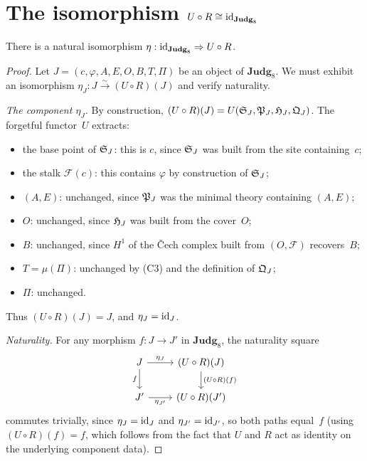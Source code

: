 \section{The isomorphism $U \circ R \cong \mathrm{id}_{\mathbf{Judg}_8}$}
\label{sec:UR}

\begin{theorem}
\label{thm:UR}
There is a natural isomorphism $\eta : \mathrm{id}_{\mathbf{Judg}_8}
\Rightarrow U \circ R$.
\end{theorem}

\begin{proof}
Let $J = (c, \varphi, A, E, O, B, T, \Pi)$ be an object of
$\mathbf{Judg}_8$.  We must exhibit an isomorphism
$\eta_J : J \xrightarrow{\sim} (U \circ R)(J)$ and verify
naturality.

\emph{The component $\eta_J$.}  By construction,
$(U \circ R)(J) = U(\mathfrak{S}_J, \mathfrak{P}_J, \mathfrak{H}_J, \mathfrak{Q}_J)$.
The forgetful functor~$U$ extracts:
\begin{itemize}[nosep]
\item the base point of $\mathfrak{S}_J$: this is $c$, since $\mathfrak{S}_J$
  was built from the site containing~$c$;
\item the stalk $\mathcal{F}(c)$: this contains $\varphi$ by
  construction of $\mathfrak{S}_J$;
\item $(A, E)$: unchanged, since $\mathfrak{P}_J$ was the minimal theory
  containing $(A, E)$;
\item $O$: unchanged, since $\mathfrak{H}_J$ was built from the cover~$O$;
\item $B$: unchanged, since $H^1$ of the \v{C}ech complex built
  from $(O, \mathcal{F})$ recovers~$B$;
\item $T = \mu(\Pi)$: unchanged by (C3) and the definition of
  $\mathfrak{Q}_J$;
\item $\Pi$: unchanged.
\end{itemize}
Thus $(U \circ R)(J) = J$, and $\eta_J = \mathrm{id}_J$.

\emph{Naturality.}  For any morphism $f : J \to J'$ in
$\mathbf{Judg}_8$, the naturality square
\[
\begin{tikzcd}
  J \ar[r, "\eta_J"] \ar[d, "f"'] &
  (U \circ R)(J) \ar[d, "(U \circ R)(f)"] \\
  J' \ar[r, "\eta_{J'}"'] & (U \circ R)(J')
\end{tikzcd}
\]
commutes trivially, since $\eta_J = \mathrm{id}_J$ and
$\eta_{J'} = \mathrm{id}_{J'}$, so both paths equal~$f$ (using
$(U \circ R)(f) = f$, which follows from the fact that $U$ and $R$
act as identity on the underlying component data).
\end{proof}

